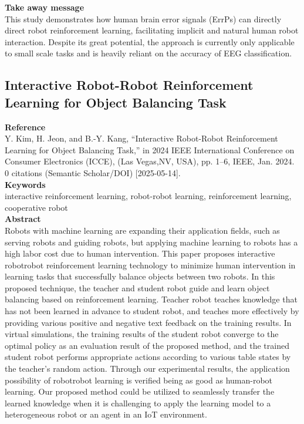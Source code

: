 \documentclass[report.tex]{subfiles}
\begin{document}
\noindent\textbf{Take away message}  \\
This study demonstrates how human brain error signals (ErrPs) can directly direct robot reinforcement learning, facilitating implicit and natural human robot interaction. Despite its great potential, the approach is currently only applicable to small scale tasks and is heavily reliant on the accuracy of EEG classification.
















\subsection{Interactive Robot-Robot Reinforcement Learning for Object Balancing Task} 

\noindent\textbf{Reference} \\
\cite{kim_interactive_2024}Y. Kim, H. Jeon, and B.-Y. Kang, “Interactive Robot-Robot Reinforcement Learning for Object Balancing Task,” in 2024 IEEE International Conference on Consumer Electronics (ICCE), (Las Vegas,NV, USA), pp. 1–6, IEEE, Jan. 2024. 0 citations (Semantic Scholar/DOI) [2025-05-14]. \\


\noindent\textbf{Keywords} \\
interactive reinforcement learning, robot-robot learning, reinforcement learning, cooperative robot
   \\

\noindent\textbf{Abstract} \\
Robots with machine learning are expanding their application fields, such as serving robots and guiding robots, but applying machine learning to robots has a high labor cost due to human intervention. This paper proposes interactive robotrobot reinforcement learning technology to minimize human intervention in learning tasks that successfully balance objects between two robots. In this proposed technique, the teacher and student robot guide and learn object balancing based on reinforcement learning. Teacher robot teaches knowledge that has not been learned in advance to student robot, and teaches more effectively by providing various positive and negative text feedback on the training results. In virtual simulations, the training results of the student robot converge to the optimal policy as an evaluation result of the proposed method, and the trained student robot performs appropriate actions according to various table states by the teacher’s random action. Through our experimental results, the application possibility of robotrobot learning is verified being as good as human-robot learning. Our proposed method could be utilized to seamlessly transfer the learned knowledge when it is challenging to apply the learning model to a heterogeneous robot or an agent in an IoT environment.\\
\end{document}
